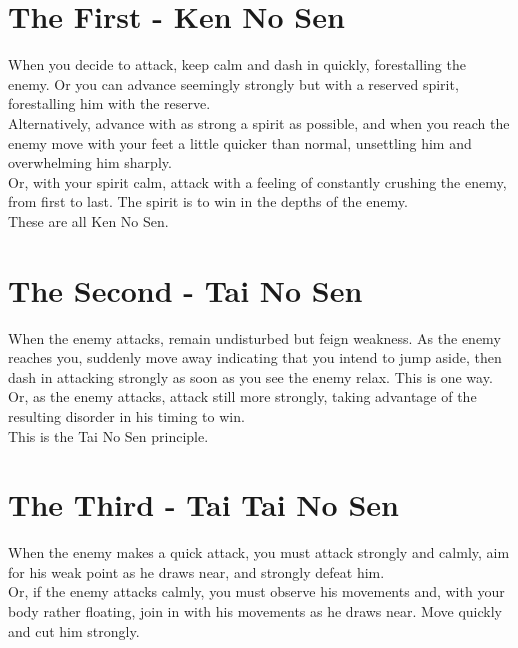 \section{The First - Ken No Sen}

When you decide to attack, keep calm and dash in quickly, forestalling the enemy. Or you can advance seemingly strongly but with a reserved spirit, forestalling him with the reserve.\\

Alternatively, advance with as strong a spirit as possible, and when you reach the enemy move with your feet a little quicker than normal, unsettling him and overwhelming him sharply.\\

Or, with your spirit calm, attack with a feeling of constantly crushing the enemy, from first to last. The spirit is to win in the depths of the enemy.\\

These are all Ken No Sen.\\
\section{The Second - Tai No Sen}

When the enemy attacks, remain undisturbed but feign weakness. As the enemy reaches you, suddenly move away indicating that you intend to jump aside, then dash in attacking strongly as soon as you see the enemy relax. This is one way.\\

Or, as the enemy attacks, attack still more strongly, taking advantage of the resulting disorder in his timing to win.\\

This is the Tai No Sen principle.\\
\section{The Third - Tai Tai No Sen}

When the enemy makes a quick attack, you must attack strongly and calmly, aim for his weak point as he draws near, and strongly defeat him.\\

Or, if the enemy attacks calmly, you must observe his movements and, with your body rather floating, join in with his movements as he draws near. Move quickly and cut him strongly.\\

